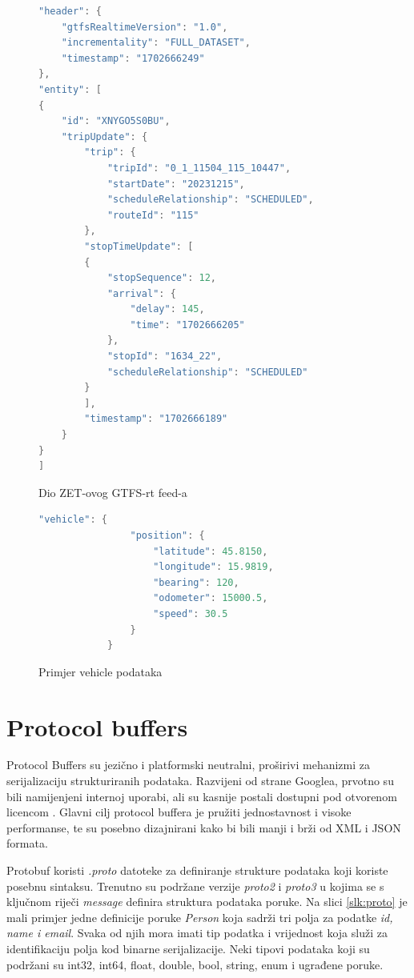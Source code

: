 \documentclass[zavrsnirad]{fer}
\begin{document}
\begin{figure}[H]
	\centering
	

	\begin{minipage}[htb]{0.58\linewidth}
		\centering
		
		\begin{lstlisting}[language=Java]
"header": {
	"gtfsRealtimeVersion": "1.0",
	"incrementality": "FULL_DATASET",
	"timestamp": "1702666249"
},
"entity": [
{
	"id": "XNYGO5S0BU",
	"tripUpdate": {
		"trip": {
			"tripId": "0_1_11504_115_10447",
			"startDate": "20231215",
			"scheduleRelationship": "SCHEDULED",
			"routeId": "115"
		},
		"stopTimeUpdate": [
		{
			"stopSequence": 12,
			"arrival": {
				"delay": 145,
				"time": "1702666205"
			},
			"stopId": "1634_22",
			"scheduleRelationship": "SCHEDULED"
		}
		],
		"timestamp": "1702666189"
	}
}
]
		\end{lstlisting} 
		\caption{Dio ZET-ovog GTFS-rt feed-a}
		\label{slk:reply1}
	\end{minipage}
	\hfill
	\begin{minipage}[htb]{0.38\linewidth}
		\centering
		\begin{lstlisting}[language=Java]
			"vehicle": {
				"position": {
					"latitude": 45.8150,
					"longitude": 15.9819,
					"bearing": 120,
					"odometer": 15000.5,
					"speed": 30.5
				}
			}
		\end{lstlisting}
		\caption{Primjer vehicle podataka}
		\label{slk:reply2}
	\end{minipage}
\end{figure}


\newpage
\section[Protobuf]{Protocol buffers}
\label{sec:protobuf}

Protocol Buffers su jezično i platformski neutralni, proširivi mehanizmi za serijalizaciju strukturiranih podataka. Razvijeni od strane Googlea, prvotno su bili namijenjeni internoj uporabi, ali su kasnije postali dostupni pod otvorenom licencom \cite{protobuf}. Glavni cilj protocol buffera je pružiti jednostavnost i visoke performanse, te su posebno dizajnirani kako bi bili manji i brži od XML i JSON formata.


Protobuf koristi \textit{.proto} datoteke za definiranje strukture podataka koji koriste posebnu sintaksu. Trenutno su podržane verzije \textit{proto2} i \textit{proto3} u kojima se s ključnom riječi \textit{message} definira struktura podataka poruke. Na slici \ref{slk:proto} je mali primjer jedne definicije poruke \textit{Person} koja sadrži tri polja za podatke \textit{id, name i email}. Svaka od njih mora imati tip podatka i vrijednost koja služi za identifikaciju polja kod binarne serijalizacije. Neki tipovi podataka koji su podržani su int32, int64, float, double, bool, string, enum i ugrađene poruke.
\end{document}
